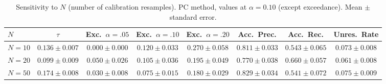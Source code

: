 \begin{table}[t]
\centering\small
\begin{tabular}{lccccccc}
\toprule
$N$ & $\tau$ & Exc.\ $\alpha{=}.05$ & Exc.\ $\alpha{=}.10$ & Exc.\ $\alpha{=}.20$ & Acc.\ Prec. & Acc.\ Rec. & Unres.\ Rate \\
\midrule
$N=10$ & $0.136 \pm 0.007$ & $0.000 \pm 0.000$ & $0.120 \pm 0.033$ & $0.270 \pm 0.058$ & $0.811 \pm 0.033$ & $0.543 \pm 0.065$ & $0.073 \pm 0.008$ \\
$N=20$ & $0.099 \pm 0.009$ & $0.050 \pm 0.026$ & $0.105 \pm 0.036$ & $0.195 \pm 0.049$ & $0.770 \pm 0.038$ & $0.660 \pm 0.057$ & $0.061 \pm 0.008$ \\
$N=50$ & $0.174 \pm 0.008$ & $0.030 \pm 0.008$ & $0.075 \pm 0.015$ & $0.180 \pm 0.029$ & $0.829 \pm 0.034$ & $0.541 \pm 0.072$ & $0.075 \pm 0.009$ \\
\bottomrule
\end{tabular}
\caption{Sensitivity to $N$ (number of calibration resamples). PC method, values at $\alpha=0.10$ (except exceedance). Mean $\pm$ standard error.}
\label{tab:nsens}
\end{table}
